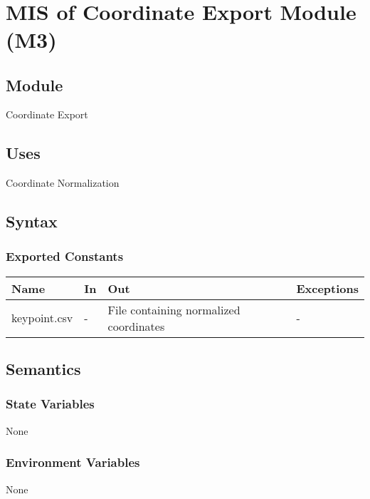 \documentclass[12pt, titlepage]{article}
\begin{document}
~\newpage

\section{MIS of Coordinate Export Module (M3)} \label{m3}

\subsection{Module}

Coordinate Export

\subsection{Uses}

Coordinate Normalization

\subsection{Syntax}

\subsubsection{Exported Constants}

\begin{center}
\begin{tabular}{p{5cm} p{3cm} p{3cm} p{4cm}}
\hline
\textbf{Name} & \textbf{In} & \textbf{Out} & \textbf{Exceptions} \\
\hline
keypoint.csv & - & File containing normalized coordinates & - \\
\hline
\end{tabular}
\end{center}

\subsection{Semantics}

\subsubsection{State Variables}

None

\subsubsection{Environment Variables}

None
\end{document}
